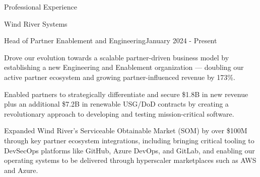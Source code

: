 \documentclass{resume} %
\begin{document}
\begin{rSection}{Professional Experience}
  
  \begin{rCompany}{Wind River Systems}{}{}

    \begin{rSubSubsection}{Head of Partner Enablement and Engineering}{}{January 2024 - Present}
      \item Drove our evolution towards a scalable partner-driven business model by establishing a new Engineering and Enablement organization --- doubling our active partner ecosystem and growing partner-influenced revenue by 173\%.
      \item Enabled partners to strategically differentiate and secure \$1.8B in new revenue plus an additional \$7.2B in renewable USG/DoD contracts by creating a revolutionary approach to developing and testing mission-critical software.
      \item Expanded Wind River's Serviceable Obtainable Market (SOM) by over \$100M through key partner ecosystem integrations, including bringing critical tooling to DevSecOps platforms like GitHub, Azure DevOps, and GitLab, and enabling our operating systems to be delivered through hyperscaler marketplaces such as AWS and Azure.
      

    \end{rSubSubsection}
    

\end{rCompany}
\end{rSection}
\end{document}
